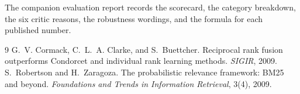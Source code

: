 \documentclass[11pt,a4paper]{article}
\begin{document}
The companion evaluation report records the scorecard, the category breakdown, the six critic reasons, the robustness wordings, and the formula for each published number.

\begin{thebibliography}{9}
 G.~V. Cormack, C.~L.~A. Clarke, and S.~Buettcher.
Reciprocal rank fusion outperforms Condorcet and individual rank learning methods.
\textit{SIGIR}, 2009.
 S.~Robertson and H.~Zaragoza.
The probabilistic relevance framework: BM25 and beyond.
\textit{Foundations and Trends in Information Retrieval}, 3(4), 2009.
\end{thebibliography}
\end{document}
